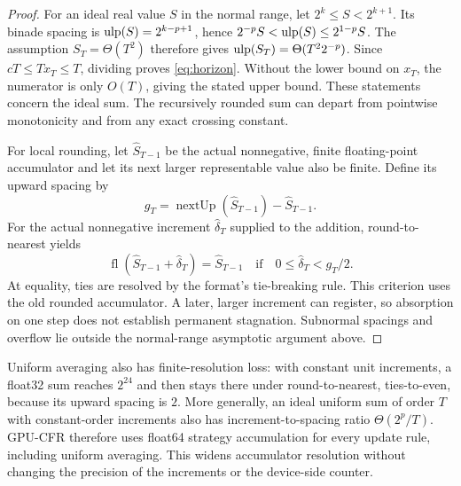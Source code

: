 \begin{proof}
For an ideal real value $S$ in the normal range, let $2^k\le S<2^{k+1}$.
Its binade spacing is $\mathrm{ulp}(S)=2^{k-p+1}$, hence
$2^{-p}S<\mathrm{ulp}(S)\le 2^{1-p}S$.
The assumption $S_T=\Theta(T^2)$ therefore gives
$\mathrm{ulp}(S_T)=\Theta(T^2 2^{-p})$. Since $cT\le T x_T\le T$,
dividing proves \cref{eq:horizon}. Without the lower bound on $x_T$,
the numerator is only $O(T)$, giving the stated upper bound.
These statements concern the ideal sum. The recursively rounded sum can
depart from pointwise monotonicity and from any exact crossing constant.

For local rounding, let $\widehat{S}_{T-1}$ be the actual nonnegative,
finite floating-point accumulator and let its next larger representable
value also be finite. Define its upward spacing by
\[
    g_T=\operatorname{nextUp}(\widehat{S}_{T-1})-\widehat{S}_{T-1}.
\]
For the actual nonnegative increment $\widehat{\delta}_T$ supplied to the
addition, round-to-nearest yields
\[
    \operatorname{fl}(\widehat{S}_{T-1}+\widehat{\delta}_T)
    =\widehat{S}_{T-1}
    \quad\text{if}\quad 0\le\widehat{\delta}_T<g_T/2.
\]
At equality, ties are resolved by the format's tie-breaking rule.
This criterion uses the old rounded accumulator.
A later, larger increment can register, so absorption on one step does not
establish permanent stagnation. Subnormal spacings and overflow lie outside
the normal-range asymptotic argument above.
\end{proof}

Uniform averaging also has finite-resolution loss: with constant unit
increments, a float32 sum reaches $2^{24}$ and then stays there under
round-to-nearest, ties-to-even, because its upward spacing is $2$.
More generally, an ideal uniform sum of order $T$ with constant-order
increments also has increment-to-spacing ratio $\Theta(2^p/T)$.
GPU-CFR therefore uses float64 strategy accumulation for every update rule,
including uniform averaging. This widens accumulator resolution without
changing the precision of the increments or the device-side counter.
